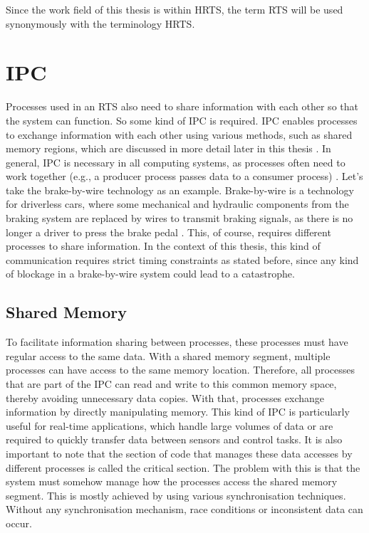 Since the work field of this thesis is within \ac{HRTS}, the term \ac{RTS} will be used synonymously with the terminology \ac{HRTS}.

\section{\acf{IPC}}\label{sec:ipc}

Processes used in an \ac{RTS} also need to share information with each other so that the system can function. So some kind of \ac{IPC} is required. \ac{IPC} enables processes to exchange information with each other using various methods, such as shared memory regions, which are discussed in more detail later in this thesis \cite{IPCMechanisms}. In general, \ac{IPC} is necessary in all computing systems, as processes often need to work together (e.g., a producer process passes data to a consumer process) \cite{IPCMechanisms}. Let's take the brake-by-wire technology as an example. Brake-by-wire is a technology for driverless cars, where some mechanical and hydraulic components from the braking system are replaced by wires to transmit braking signals, as there is no longer a driver to press the brake pedal \cite{BrakeByWire}. This, of course, requires different processes to share information. In the context of this thesis, this kind of communication requires strict timing constraints as stated before, since any kind of blockage in a brake-by-wire system could lead to a catastrophe.

\subsection{Shared Memory}\label{subsec:shared-memory}

To facilitate information sharing between processes, these processes must have regular access to the same data. With a shared memory segment, multiple processes can have access to the same memory location. Therefore, all processes that are part of the \ac{IPC} can read and write to this common memory space, thereby avoiding unnecessary data copies. With that, processes exchange information by directly manipulating memory. This kind of \ac{IPC} is particularly useful for real-time applications, which handle large volumes of data or are required to quickly transfer data between sensors and control tasks. It is also important to note that the section of code that manages these data accesses by different processes is called the critical section. The problem with this is that the system must somehow manage how the processes access the shared memory segment. This is mostly achieved by using various synchronisation techniques. Without any synchronisation mechanism, race conditions or inconsistent data can occur. \cite{sharedmem}

